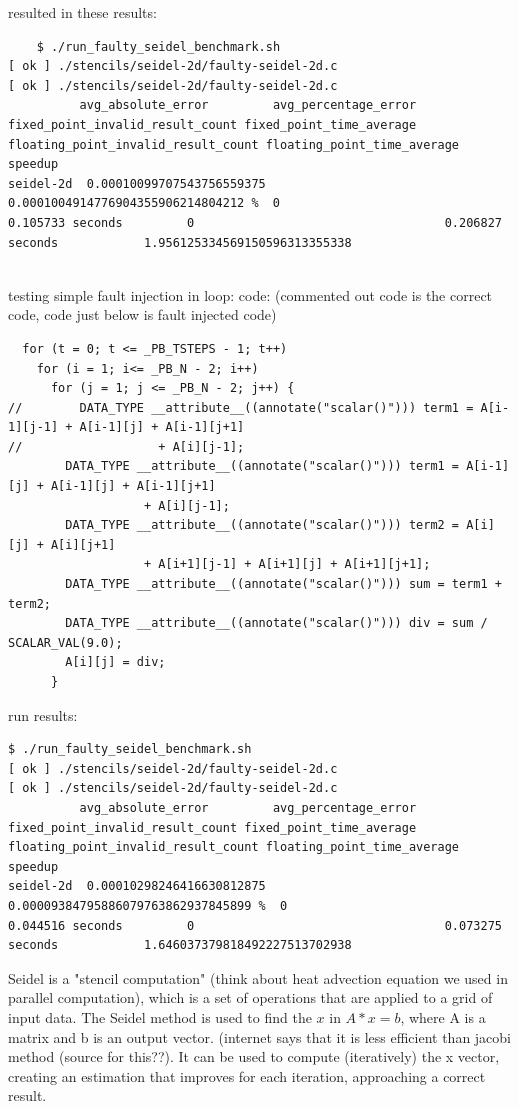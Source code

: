 resulted in these results:
\begin{verbatim}
    $ ./run_faulty_seidel_benchmark.sh 
[ ok ] ./stencils/seidel-2d/faulty-seidel-2d.c
[ ok ] ./stencils/seidel-2d/faulty-seidel-2d.c
          avg_absolute_error         avg_percentage_error                 fixed_point_invalid_result_count fixed_point_time_average floating_point_invalid_result_count floating_point_time_average speedup                       
seidel-2d  0.00010099707543756559375  0.0001004914776904355906214804212 %  0                                0.105733 seconds         0                                   0.206827 seconds            1.956125334569150596313355338


\end{verbatim}


testing simple fault injection in loop:
code: (commented out code is the correct code, code just below is fault injected code)
\begin{verbatim}
  for (t = 0; t <= _PB_TSTEPS - 1; t++)
    for (i = 1; i<= _PB_N - 2; i++)
      for (j = 1; j <= _PB_N - 2; j++) {
//        DATA_TYPE __attribute__((annotate("scalar()"))) term1 = A[i-1][j-1] + A[i-1][j] + A[i-1][j+1]
//                   + A[i][j-1];
        DATA_TYPE __attribute__((annotate("scalar()"))) term1 = A[i-1][j] + A[i-1][j] + A[i-1][j+1]
                   + A[i][j-1];
        DATA_TYPE __attribute__((annotate("scalar()"))) term2 = A[i][j] + A[i][j+1]
                   + A[i+1][j-1] + A[i+1][j] + A[i+1][j+1];
        DATA_TYPE __attribute__((annotate("scalar()"))) sum = term1 + term2;
        DATA_TYPE __attribute__((annotate("scalar()"))) div = sum / SCALAR_VAL(9.0);
        A[i][j] = div;
      }
\end{verbatim}
run results:
\begin{verbatim}
$ ./run_faulty_seidel_benchmark.sh 
[ ok ] ./stencils/seidel-2d/faulty-seidel-2d.c
[ ok ] ./stencils/seidel-2d/faulty-seidel-2d.c
          avg_absolute_error         avg_percentage_error                  fixed_point_invalid_result_count fixed_point_time_average floating_point_invalid_result_count floating_point_time_average speedup                       
seidel-2d  0.00010298246416630812875  0.00009384795886079763862937845899 %  0                                0.044516 seconds         0                                   0.073275 seconds            1.646037379818492227513702938

\end{verbatim}


Seidel is a "stencil computation" (think about heat advection equation we used in parallel computation), which is a set of operations that are applied to a grid of input data. The Seidel method is used to find the $x$ in $A * x = b$, where A is a matrix and b is an output vector. (internet says that it is less efficient than jacobi method (source for this??). It can be used to compute (iteratively) the x vector, creating an estimation that improves for each iteration, approaching a correct result.



